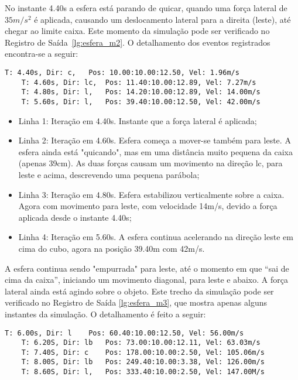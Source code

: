 \documentclass[12pt]{article}
\begin{document}
No instante 4.40s a esfera está parando de quicar, quando uma força lateral de $35m/s^{2}$ é aplicada, causando um deslocamento lateral para a direita (leste), até chegar ao limite caixa. Este momento da simulação pode ser verificado no Registro de Saída~\ref{lg:esfera_m2}. O detalhamento dos eventos registrados encontra-se a seguir:

\begin{lstlisting}[frame=single,caption=Esfera sobre a caixa. \label{lg:esfera_m2}]
	T: 4.40s, Dir: c, 	Pos: 10.00:10.00:12.50, Vel: 1.96m/s
	T: 4.60s, Dir: lc, 	Pos: 11.40:10.00:12.89, Vel: 7.27m/s
	T: 4.80s, Dir: l, 	Pos: 14.20:10.00:12.89, Vel: 14.00m/s
	T: 5.60s, Dir: l, 	Pos: 39.40:10.00:12.50, Vel: 42.00m/s
\end{lstlisting}

\begin{itemize}
	\item Linha 1: Iteração em 4.40s. Instante que a força lateral é aplicada;
	\item Linha 2: Iteração em 4.60s. Esfera começa a mover-se também para leste. A esfera ainda está "quicando", mas em uma distância muito pequena da caixa (apenas 39cm). As duas forças causam um movimento na direção lc, para leste e acima, descrevendo uma pequena parábola;
	\item Linha 3: Iteração em 4.80s. Esfera estabilizou verticalmente sobre a caixa. Agora com movimento para leste, com velocidade 14m/s, devido a força aplicada desde o instante 4.40s; 
	\item Linha 4: Iteração em 5.60s. A esfera continua acelerando na direção leste em cima do cubo, agora na posição 39.40m com 42m/s.
\end{itemize}

A esfera continua sendo "empurrada" para leste, até o momento em que “sai de cima da caixa”, iniciando um movimento diagonal, para leste e abaixo. A força lateral ainda está agindo sobre o objeto. Este trecho da simulação pode ser verificado no Registro de Saída \ref{lg:esfera_m3}, que mostra apenas alguns instantes da simulação. O detalhamento é feito a seguir:

\begin{lstlisting}[frame=single,caption=Esfera se movendo diagonalmente\label{lg:esfera_m3}]
	T: 6.00s, Dir: l	Pos: 60.40:10.00:12.50, Vel: 56.00m/s
	T: 6.20S, Dir: lb 	Pos: 73.00:10.00:12.11, Vel: 63.03m/s
	T: 7.40S, Dir: c 	Pos: 178.00:10.00:2.50, Vel: 105.06m/s
	T: 8.00S, Dir: lb 	Pos: 249.40:10.00:3.38, Vel: 126.00m/s
	T: 8.60S, Dir: l, 	Pos: 333.40:10.00:2.50, Vel: 147.00M/s
\end{lstlisting}
\end{document}
